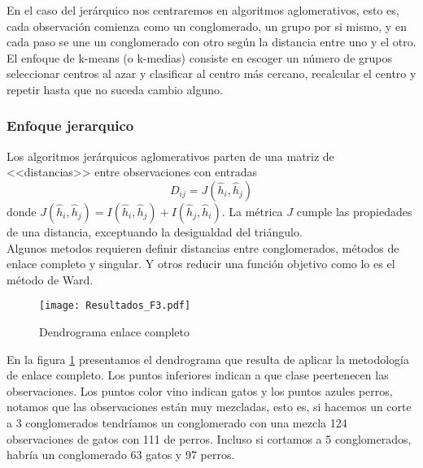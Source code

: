 \documentclass[twocolumn,10pt]{asme2ej}
\begin{document}
 En el caso del jer\'arquico nos centraremos en algoritmos aglomerativos, esto es, cada observaci\'on comienza como un conglomerado, un grupo por si mismo, y en cada paso se une un conglomerado con otro seg\'un la distancia entre uno y el otro.\\

El enfoque de k-means (o k-medias) consiste en escoger un n\'umero de grupos seleccionar centros al azar y clasificar al centro m\'as cercano, recalcular el centro y repetir hasta que no suceda cambio alguno.
\subsubsection*{Enfoque jerarquico} %
\label{ssub:enfoque_jerarquico}
Los algoritmos jer\'arquicos aglomerativos parten de una matriz de <<distancias>> entre observaciones con entradas 
$$D_{ij}=J(\hat{h}_i,\hat{h}_j)$$
donde $J(\hat{h}_i,\hat{h}_j)=I(\hat{h}_i,\hat{h}_j)+I(\hat{h}_j,\hat{h}_i)$. La m\'etrica $J$ cumple las propiedades de una distancia, exceptuando la desigualdad del tri\'angulo.\\

Algunos metodos requieren definir distancias entre conglomerados, m\'etodos de enlace completo y singular. Y otros reducir una funci\'on objetivo como lo es el m\'etodo de Ward.\\

\begin{figure}[h]
  \centering
    \texttt{[image: Resultados\_F3.pdf]}
  \caption{Dendrograma enlace completo}
  \label{plot:dendro_enc}
\end{figure}
En la figura \ref{plot:dendro_enc} presentamos el dendrograma que resulta de aplicar la metodolog\'ia de enlace completo. Los puntos inferiores indican a que clase peertenecen las observaciones. Los puntos color vino indican \textcolor{vino}{gatos} y los puntos azules \textcolor{azulperruno}{perros}, notamos que las observaciones est\'an muy mezcladas, esto es, si hacemos un corte a 3 conglomerados tendr\'iamos un conglomerado con una mezcla 124 observaciones de gatos con 111 de perros. Incluso si cortamos a 5 conglomerados, habr\'ia un conglomerado 63 gatos y 97 perros.\\
\end{document}
